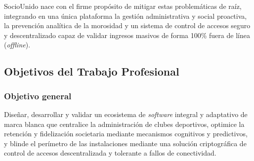 \documentclass[conference, a4paper]{IEEEtran}
\begin{document}
SocioUnido nace con el firme prop\'osito de mitigar estas problem\'aticas de ra\'iz, integrando en una \'unica plataforma la gesti\'on administrativa y social proactiva, la prevenci\'on anal\'itica de la morosidad y un sistema de control de accesos seguro y descentralizado capaz de validar ingresos masivos de forma 100\% fuera de l\'inea (\textit{offline}).

\subsection{Objetivos del Trabajo Profesional}
\subsubsection{Objetivo general}
Dise\~nar, desarrollar y validar un ecosistema de \textit{software} integral y adaptativo de marca blanca que centralice la administraci\'on de clubes deportivos, optimice la retenci\'on y fidelizaci\'on societaria mediante mecanismos cognitivos y predictivos, y blinde el per\'imetro de las instalaciones mediante una soluci\'on criptogr\'afica de control de accesos descentralizada y tolerante a fallos de conectividad.
\end{document}
